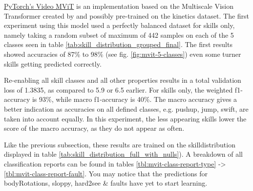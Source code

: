 \href{https://pytorch.org/vision/main/models/video_mvit.html}{PyTorch's Video MViT} is an implementation based on the Multiscale Vision Transformer created by \textcite{Fan2021} and possibly pre-trained on the kinetics dataset.
The first experiment using this model used a perfectly balanced dataset for skills only, namely taking a random subset of maximum of 442 samples on each of the 5 classes seen in table \ref{tab:skill_distribution_grouped_final}.
The first results showed accuracies of 87\% to 98\% (see fig. \ref{fig:mvit-5-classes}) even some turner skills getting predicted correctly.

Re-enabling all skill classes and all other properties results in a total validation loss of 1.3835, as compared to 5.9 or 6.5 earlier.
For skills only, the weighted f1-accuracy is 93\%, while macro f1-accuracy is 40\%.
The macro accuracy gives a better indication as accuracies on all defined classes, e.g. pushup, jump, swift, are taken into account equally. In this experiment, the less appearing skills lower the score of the macro accuracy, as they do not appear as often.

Like the previous subsection, these results are trained on the skilldistribution displayed in table \ref{tab:skill_distribution_full_with_nulls}).
A breakdown of all classification reports can be found in tables \ref{tbl:mvit-class-report-type} -> \ref{tbl:mvit-class-report-fault}. You may notice that the predictions for bodyRotations, sloppy, hard2see \& faults have yet to start learning.

